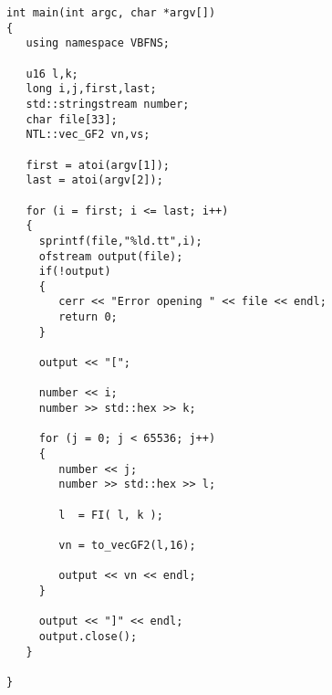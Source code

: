 \begin{verbatim}
int main(int argc, char *argv[])
{
   using namespace VBFNS;

   u16 l,k;
   long i,j,first,last;
   std::stringstream number;
   char file[33];
   NTL::vec_GF2 vn,vs;

   first = atoi(argv[1]);
   last = atoi(argv[2]);

   for (i = first; i <= last; i++)
   {
     sprintf(file,"%ld.tt",i);
     ofstream output(file);
     if(!output)
     {
        cerr << "Error opening " << file << endl;
        return 0;
     }

     output << "[";

     number << i;
     number >> std::hex >> k;

     for (j = 0; j < 65536; j++)
     {
        number << j;
        number >> std::hex >> l;

        l  = FI( l, k );

        vn = to_vecGF2(l,16);

        output << vn << endl;
     }

     output << "]" << endl;
     output.close();
   }

}
\end{verbatim}


